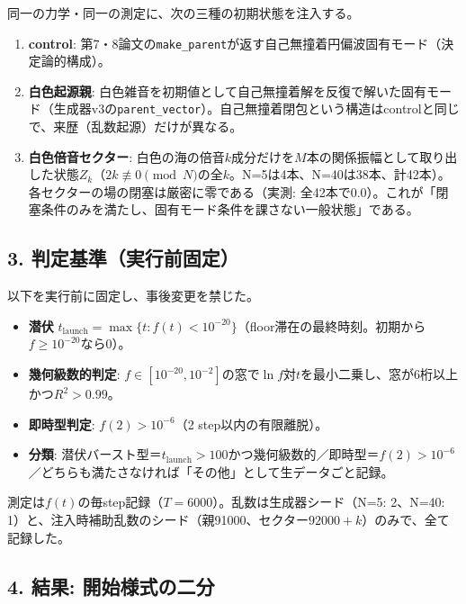\documentclass[
  a4paper,
]{ltjsarticle}
\providecommand{\tightlist}{%
  \setlength{\itemsep}{0pt}\setlength{\parskip}{0pt}}
\begin{document}
同一の力学・同一の測定に、次の三種の初期状態を注入する。

\begin{enumerate}
\def\labelenumi{\arabic{enumi}.}
\tightlist
\item
  \textbf{control}:
  第7・8論文の\texttt{make\_parent}が返す自己無撞着円偏波固有モード（決定論的構成）。
\item
  \textbf{白色起源親}:
  白色雑音を初期値として自己無撞着解を反復で解いた固有モード（生成器v3の\texttt{parent\_vector}）。自己無撞着閉包という構造はcontrolと同じで、来歴（乱数起源）だけが異なる。
\item
  \textbf{白色倍音セクター}:
  白色の海の倍音\(k\)成分だけを\(M\)本の関係振幅として取り出した状態\(Z_k\)（\(2k\not\equiv0\pmod N\)の全\(k\)。N=5は4本、N=40は38本、計42本）。各セクターの場の閉塞は厳密に零である（実測:
  全42本で0.0）。これが「閉塞条件のみを満たし、固有モード条件を課さない一般状態」である。
\end{enumerate}

\subsection{3.
判定基準（実行前固定）}\label{ux5224ux5b9aux57faux6e96ux5b9fux884cux524dux56faux5b9a}

以下を実行前に固定し、事後変更を禁じた。

\begin{itemize}
\tightlist
\item
  \textbf{潜伏}
  \(t_{\mathrm{launch}}=\max\{t: f(t)<10^{-20}\}\)（floor滞在の最終時刻。初期から\(f\ge10^{-20}\)なら0）。
\item
  \textbf{幾何級数的判定}:
  \(f\in[10^{-20},10^{-2}]\)の窓で\(\ln f\)対\(t\)を最小二乗し、窓が6桁以上かつ\(R^2>0.99\)。
\item
  \textbf{即時型判定}: \(f(2)>10^{-6}\)（2 step以内の有限離脱）。
\item
  \textbf{分類}:
  潜伏バースト型＝\(t_{\mathrm{launch}}>100\)かつ幾何級数的／即時型＝\(f(2)>10^{-6}\)／どちらも満たさなければ「その他」として生データごと記録。
\end{itemize}

測定は\(f(t)\)の毎step記録（\(T=6000\)）。乱数は生成器シード（N=5:
2、N=40:
1）と、注入時補助乱数のシード（親91000、セクター\(92000+k\)）のみで、全て記録した。

\subsection{4. 結果:
開始様式の二分}\label{ux7d50ux679c-ux958bux59cbux69d8ux5f0fux306eux4e8cux5206}
\end{document}

